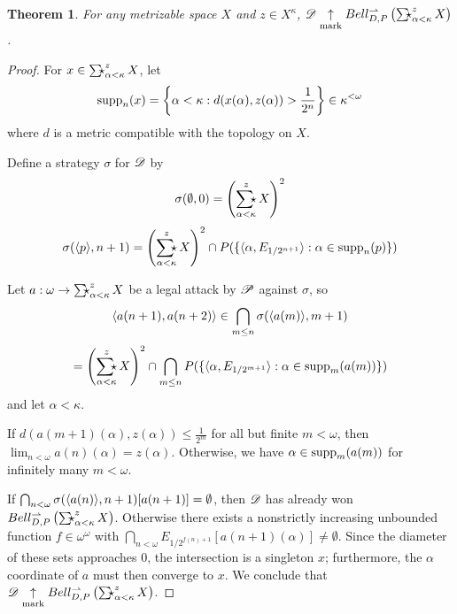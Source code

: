 \documentclass{amsart}
\newtheorem{theorem}{Theorem}[section]
\theoremstyle{definition}
\begin{document}
  \begin{theorem}
    For any metrizable space \(X\) and \(z\in X^\kappa\),
    \(\pl D\markwin\bellConGame{\SigmaStarProd_{\alpha<\kappa}^z X}\).
  \end{theorem}

  \begin{proof}
    For \(x\in\SigmaStarProd_{\alpha<\kappa}^z X\), let
      \[
        \textrm{supp}_n(x)
          =
        \left\{
          \alpha<\kappa
        :
          d(x(\alpha),z(\alpha))>\frac{1}{2^n}
        \right\}
          \in
        \kappa^{<\omega}
      \]
    where \(d\) is a metric compatible with the topology on \(X\).

    Define a strategy \(\sigma\) for \(\mathscr{D}\) by
      \[
        \sigma(\emptyset,0)
          =
        \left(\SigmaStarProd_{\alpha<\kappa}^z X\right)^2
      \]
      \[
        \sigma(\<p\>,n+1)
          =
        \left(\SigmaStarProd_{\alpha<\kappa}^z X\right)^2
          \cap
        P(\{
          \<\alpha,E_{1/2^{n+1}}\>
            :
          \alpha\in\supp_n(p)
        \})
      \]

    Let \(a:\omega\to \SigmaStarProd_{\alpha<\kappa}^z X\) be a legal
    attack by \(\mathscr{P}\) against \(\sigma\), so
      \[
        \langle a(n+1),a(n+2)\rangle
          \in
        \bigcap_{m\leq n}
        \sigma(\langle a(m)\rangle,m+1)
      \]
      \[
          =
        \left(\SigmaStarProd_{\alpha<\kappa}^z X\right)^2
          \cap
        \bigcap_{m\leq n}
        P(\{
          \<\alpha,E_{1/2^{m+1}}\>
            :
          \alpha\in\supp_m(a(m))
        \})
      \]
    and let \(\alpha<\kappa\).

    If \(d(a(m+1)(\alpha),z(\alpha))\leq\frac{1}{2^m}\) for all but finite
    \(m<\omega\), then  \(\lim_{n<\omega}a(n)(\alpha)=z(\alpha)\).
    Otherwise, we have \(\alpha\in\textrm{supp}_m(a(m))\) for infinitely many
    \(m<\omega\).

    If
    \(\bigcap_{n<\omega}\sigma(\langle a(n)\rangle,n+1)[a(n+1)]=\emptyset\), then
    \(\mathscr{D}\) has already won
    \(\bellConGame{\SigmaStarProd_{\alpha<\kappa}^z X}\).
    Otherwise there exists a nonstrictly increasing
    unbounded function \(f\in\omega^\omega\) with
    \(\bigcap_{n<\omega}E_{1/2^{f(n)+1}}[a(n+1)(\alpha)]\not=\emptyset\).
    Since the diameter of these sets approaches \(0\), the intersection is
    a singleton \(x\); furthermore, the \(\alpha\) coordinate of \(a\) must
    then converge to \(x\). We conclude that
    \(\pl D\markwin\bellConGame{\SigmaStarProd_{\alpha<\kappa}^z X}\).
  \end{proof}
\end{document}
